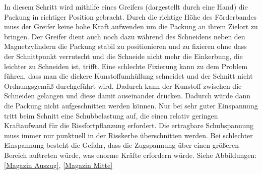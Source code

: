 In diesem Schritt wird mithilfe eines Greifers (dargestellt durch eine Hand) die Packung in richtiger Position gebracht.
Durch die richtige Höhe des Förderbandes muss der Greifer keine hohe Kraft aufwenden um die Packung an ihrem Zielort zu bringen. Der Greifer dient auch noch dazu während des Schneidens neben den Magnetzylindern die Packung stabil zu positionieren und zu fixieren ohne dass der Schnittpunkt verrutscht und die Schneide nicht mehr die Einkerbung, die leichter zu Schneiden ist, trifft. Eine schlechte Fixierung kann zu dem Problem führen, dass man die dickere Kunstoffumhüllung schneidet und der Schnitt nicht Ordnungsgemäß durchgeführt wird. Dadurch kann der Kunstoff zwischen die Schneiden gelangen und diese damit auseinander drücken. Dadurch würde dann die Packung nicht aufgeschnitten werden können. Nur bei sehr guter Einspannung tritt beim Schnitt eine Schubbelastung auf, die einen relativ geringen Kraftaufwand für die Rissfortpflanzung erfordert. Die ertragbare Schubspannung muss immer nur punktuell in der Risskerbe überschnitten werden. Bei schlechter Einspannung besteht die Gefahr, dass die Zugspannung über einen größeren Bereich auftreten würde, was enorme Kräfte erfordern würde. Siehe Abbildungen: \ref{Magazin Auszug}, \ref{Magazin Mitte}

